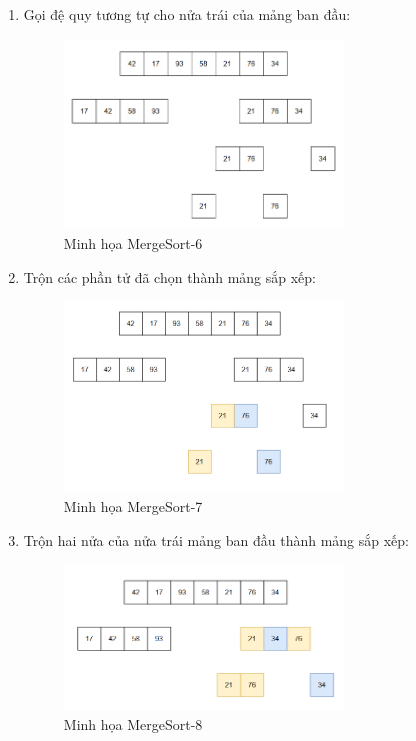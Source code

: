 \begin{enumerate}
    \item Gọi đệ quy tương tự cho nửa trái của mảng ban đầu:
    \begin{figure}[H]
        \centering
        \includegraphics[width=0.7\textwidth]{img/merge_sort/6.png}
        \caption{Minh họa MergeSort-6}
    \end{figure}
    
    \item Trộn các phần tử đã chọn thành mảng sắp xếp:
    \begin{figure}[H]
        \centering
        \includegraphics[width=0.7\textwidth]{img/merge_sort/7.png}
        \caption{Minh họa MergeSort-7}
    \end{figure}
    
    \item Trộn hai nửa của nửa trái mảng ban đầu thành mảng sắp xếp:
    \begin{figure}[H]
        \centering
        \includegraphics[width=0.7\textwidth]{img/merge_sort/8.png}
        \caption{Minh họa MergeSort-8}
    \end{figure}
    

\end{enumerate}
